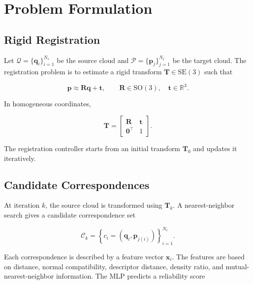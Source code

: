 \documentclass[conference]{IEEEtran}
\newcommand{\R}{\mathbb{R}}
\newcommand{\SE}{\mathrm{SE}}
\newcommand{\SO}{\mathrm{SO}}
\newcommand{\T}{\bm{T}}
\newcommand{\Rmat}{\bm{R}}
\newcommand{\tvec}{\bm{t}}
\newcommand{\Q}{\mathcal{Q}}
\newcommand{\Pcloud}{\mathcal{P}}
\newcommand{\C}{\mathcal{C}}
\newcommand{\x}{\bm{x}}
\newcommand{\Tzero}{\T_{0}}
\begin{document}
\section{Problem Formulation}
\label{sec:problem_formulation}

\subsection{Rigid Registration}
\label{subsec:rigid_registration}

Let $\Q=\{\bm{q}_i\}_{i=1}^{N_s}$ be the source cloud and $\Pcloud=\{\bm{p}_j\}_{j=1}^{N_t}$ be the target cloud. The registration problem is to estimate a rigid transform $\T \in \SE(3)$ such that

\begin{equation}
    \bm{p} \approx \Rmat \bm{q} + \tvec,
    \qquad
    \Rmat \in \SO(3),
    \quad
    \tvec \in \R^3.
    \label{eq:rigid_transform}
\end{equation}

In homogeneous coordinates,

\begin{equation}
    \T =
    \begin{bmatrix}
        \Rmat & \tvec \\
        \bm{0}^{\top} & 1
    \end{bmatrix}.
    \label{eq:homogeneous_transform}
\end{equation}

The registration controller starts from an initial transform $\Tzero$ and updates it iteratively.

\subsection{Candidate Correspondences}
\label{subsec:candidate_correspondences}

At iteration $k$, the source cloud is transformed using $\T_k$. A nearest-neighbor search gives a candidate correspondence set

\begin{equation}
    \C_k =
    \left\{
    c_i = (\bm{q}_i, \bm{p}_{j(i)})
    \right\}_{i=1}^{N_c}.
    \label{eq:candidate_correspondences}
\end{equation}

Each correspondence is described by a feature vector $\x_i$. The features are based on distance, normal compatibility, descriptor distance, density ratio, and mutual-nearest-neighbor information. The MLP predicts a reliability score
\end{document}

